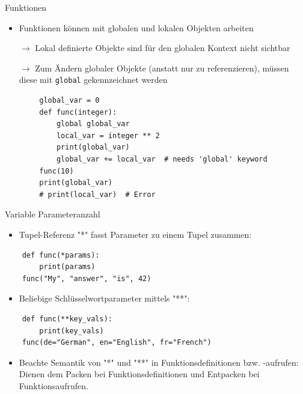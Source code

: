 \documentclass[utf8, smaller, c]{beamer}
\renewcommand{\tt}[1]{{\texttt{#1}}}
\begin{document}
\begin{frame}{Funktionen}
    \pagebreak
    
    \begin{itemize}
        \item Funktionen können mit globalen und lokalen Objekten arbeiten
        \item[$\rightarrow$] Lokal definierte Objekte sind für den globalen Kontext nicht sichtbar
        \item[$\rightarrow$] Zum Ändern globaler Objekte (anstatt nur zu referenzieren), müssen diese mit \tt{global} gekennzeichnet werden
    \end{itemize}
    \begin{lstlisting}
        global_var = 0
        def func(integer):
            global global_var
            local_var = integer ** 2
            print(global_var)
            global_var += local_var  # needs 'global' keyword
        func(10)
        print(global_var)
        # print(local_var)  # Error
    \end{lstlisting}
	
	\pagebreak
	
	\begin{block}{Variable Parameteranzahl}
	\begin{itemize}
		\item Tupel-Referenz "*" fasst Parameter zu einem Tupel zusammen:
	\end{itemize}
	\begin{lstlisting}
	def func(*params):
		print(params)
	func("My", "answer", "is", 42)
	\end{lstlisting}
	\begin{itemize}
		\item Beliebige Schlüsselwortparameter mittels "**":
	\end{itemize}
	\begin{lstlisting}
	def func(**key_vals):
		print(key_vals)
	func(de="German", en="English", fr="French")
	\end{lstlisting}
	\begin{itemize}
		\item Beachte Semantik von "*" und "**" in Funktionsdefinitionen bzw. -aufrufen: Dienen dem Packen bei Funktionsdefinitionen und Entpacken bei Funktionsaufrufen.
	\end{itemize}
	\end{block}
	
	
	

\end{frame}
\end{document}
